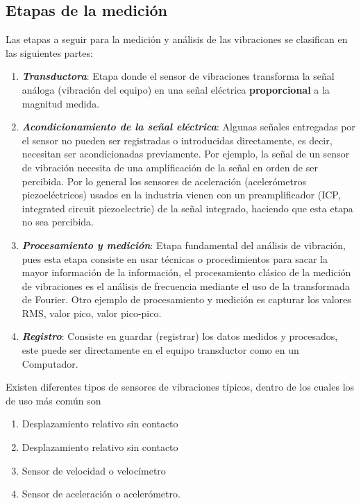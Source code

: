         \subsection{Etapas de la medición}
	        Las etapas a seguir para la medición y análisis de las vibraciones se clasifican en las siguientes partes:
			\begin{enumerate}
				\item \textbf{\textit{Transductora}}: Etapa donde el sensor de vibraciones transforma la señal análoga (vibración del equipo) en una señal eléctrica \textbf{proporcional} a la magnitud medida.
					
				\item \textbf{\textit{Acondicionamiento de la señal eléctrica}}: Algunas señales entregadas por el sensor no pueden ser registradas o introducidas directamente, es decir, necesitan ser acondicionadas previamente. Por ejemplo, la señal de un sensor de vibración necesita de una amplificación de la señal en orden de ser percibida. Por lo general los sensores de aceleración (acelerómetros piezoeléctricos) usados en la industria vienen con un preamplificador (ICP, integrated circuit piezoelectric) de la señal integrado, haciendo que esta etapa no sea percibida.
					
				\item \textbf{\textit{Procesamiento  y medición}}: Etapa fundamental del análisis de vibración, pues esta etapa consiste en usar técnicas o procedimientos para sacar la mayor información de la información, el procesamiento clásico de la medición de vibraciones es el análisis de frecuencia mediante el uso de la transformada de Fourier. Otro ejemplo de procesamiento y medición es capturar los valores RMS, valor pico, valor pico-pico.
					
				\item \textbf{\textit{Registro}}: Consiste en guardar (registrar) los datos medidos y procesados, este puede ser directamente en el equipo transductor como en un Computador.
			\end{enumerate} 
			Existen diferentes tipos de sensores de vibraciones típicos, dentro de los cuales los de uso más común son
			\begin{enumerate}
				\item Desplazamiento relativo sin contacto
				\item Desplazamiento relativo sin contacto
				\item Sensor de velocidad o velocímetro
				\item Sensor de aceleración o acelerómetro.
			\end{enumerate}
